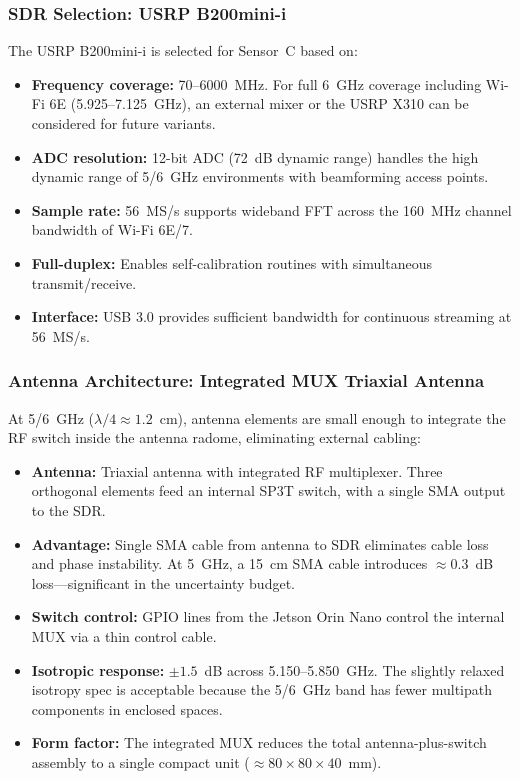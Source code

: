 \documentclass[11pt,a4paper]{article}
\begin{document}
\subsubsection{SDR Selection: USRP B200mini-i}

The USRP B200mini-i is selected for Sensor~C based on:

\begin{itemize}
    \item \textbf{Frequency coverage:} 70--6000~MHz. For full 6~GHz coverage including Wi-Fi 6E (5.925--7.125~GHz), an external mixer or the USRP X310 can be considered for future variants.
    \item \textbf{ADC resolution:} 12-bit ADC (72~dB dynamic range) handles the high dynamic range of 5/6~GHz environments with beamforming access points.
    \item \textbf{Sample rate:} 56~MS/s supports wideband FFT across the 160~MHz channel bandwidth of Wi-Fi 6E/7.
    \item \textbf{Full-duplex:} Enables self-calibration routines with simultaneous transmit/receive.
    \item \textbf{Interface:} USB 3.0 provides sufficient bandwidth for continuous streaming at 56~MS/s.
\end{itemize}

\subsubsection{Antenna Architecture: Integrated MUX Triaxial Antenna}

At 5/6~GHz ($\lambda/4 \approx 1.2$~cm), antenna elements are small enough to integrate the RF switch inside the antenna radome, eliminating external cabling:

\begin{itemize}
    \item \textbf{Antenna:} Triaxial antenna with integrated RF multiplexer. Three orthogonal elements feed an internal SP3T switch, with a single SMA output to the SDR.
    \item \textbf{Advantage:} Single SMA cable from antenna to SDR eliminates cable loss and phase instability. At 5~GHz, a 15~cm SMA cable introduces $\approx 0.3$~dB loss---significant in the uncertainty budget.
    \item \textbf{Switch control:} GPIO lines from the Jetson Orin Nano control the internal MUX via a thin control cable.
    \item \textbf{Isotropic response:} $\pm 1.5$~dB across 5.150--5.850~GHz. The slightly relaxed isotropy spec is acceptable because the 5/6~GHz band has fewer multipath components in enclosed spaces.
    \item \textbf{Form factor:} The integrated MUX reduces the total antenna-plus-switch assembly to a single compact unit ($\approx 80 \times 80 \times 40$~mm).
\end{itemize}
\end{document}
